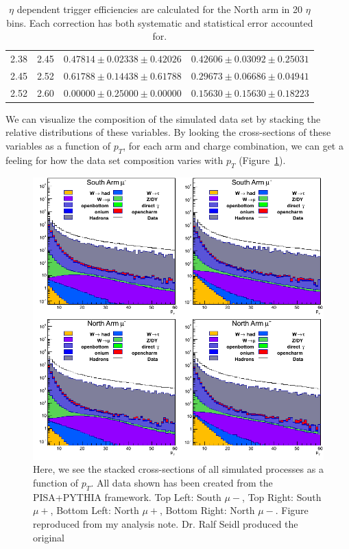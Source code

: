 \begin{table}
\begin{tabular}{cccc}
    2.38 & 2.45 & $0.47814 \pm 0.02338 \pm 0.42026$ & $0.42606 \pm 0.03092 \pm 0.25031$ \\
    2.45 & 2.52 & $0.61788 \pm 0.14438 \pm 0.61788$ & $0.29673 \pm 0.06686 \pm 0.04941$ \\
    2.52 & 2.60 & $0.00000 \pm 0.25000 \pm 0.00000$ & $0.15630 \pm 0.15630 \pm 0.18223$ \\
    \bottomrule
  \end{tabular}
  \caption{
    $\eta$ dependent trigger efficiencies are calculated for the North arm in 20
    $\eta$ bins. Each correction has both systematic and statistical error
    accounted for.
  }
  \label{tab:rapidity_corrections_north}
\end{table}

We can visualize the composition of the simulated data set by stacking the
relative distributions of these variables. By looking the cross-sections of
these variables as a function of $p_T$, for each arm and charge combination, we
can get a feeling for how the data set composition varies with $p_T$
(Figure~\ref{fig:stacked_xsec_sim}).

\begin{figure}[ht]

  \includegraphics[width=\linewidth]{./figures/stacked_xsec.png}
  \caption{
    Here, we see the stacked cross-sections of all simulated processes as a
    function of $p_T$. All data shown has been created from the PISA+PYTHIA
    framework. Top Left: South $\mu-$, Top Right: South $\mu+$, Bottom Left:
    North $\mu+$, Bottom Right: North $\mu-$. Figure reproduced from my analysis
    note. Dr. Ralf Seidl produced the original ~\cite{Seidl2014a}
  }
  \label{fig:stacked_xsec_sim}
\end{figure}

